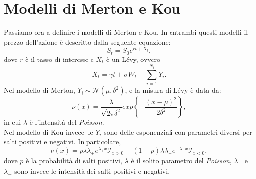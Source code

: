 \documentclass[a4paper,10pt]{report}
\theoremstyle{osservazione}
\theoremstyle{esempio}
\theoremstyle{notazione}
\theoremstyle{corollario}
\begin{document}
\section{Modelli di Merton e Kou}
Passiamo ora a definire i modelli di Merton e Kou. In entrambi questi modelli il prezzo dell'azione \`e descritto dalla seguente equazione:
\begin{equation}
S_t=S_0e^{rt+X_t},
\label{explevy}
\end{equation}
dove $r$ \`e il tasso di interesse e $X_t$ \`e un L\'evy, ovvero $$X_t=\gamma t+\sigma W_t+\sum_{i=1}^{N_t}Y_i.$$Nel modello di Merton, $Y_i\sim\mathcal{N}(\mu, \delta^2)$, e la misura di L\'evy \`e data da:
\begin{equation}
\nu(x)=\frac{\lambda}{\sqrt{2\pi\delta^2}}exp\left\{-\frac{(x-\mu)^2}{2\delta^2}\right\},
\label{merton}
\end{equation}
in cui $\lambda$ \`e l'intensit\`a del \emph{Poisson}.\\Nel modello di Kou invece, le $Y_i$ sono delle esponenziali con parametri diversi per salti positivi e negativi. In particolare, $$\nu(x)=p\lambda\lambda_+e^{\lambda_+x}\mathcal{I}_{x>0}+(1-p)\lambda\lambda_-e^{-\lambda_-x}\mathcal{I}_{x<0},$$dove $p$ \`e la probabilit\`a di salti positivi, $\lambda$ \`e il solito parametro del \emph{Poisson}, $\lambda_+$ e $\lambda_-$ sono invece le intensit\`a dei salti positivi e negativi.
\end{document}

